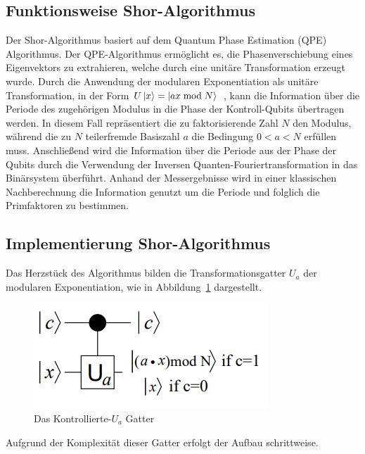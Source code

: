 \documentclass[lettersize,journal]{IEEEtran}
\begin{document}
\subsection{Funktionsweise Shor-Algorithmus}

Der Shor-Algorithmus basiert auf dem Quantum Phase Estimation (QPE) Algorithmus.
Der QPE-Algorithmus ermöglicht es, die Phasenverschiebung eines Eigenvektors zu extrahieren,
welche durch eine unitäre Transformation erzeugt wurde.
Durch die Anwendung der modularen Exponentiation als unitäre Transformation,
in der Form \(U\ket{x} = \ket{ax \bmod N}\)~\cite{IBM:Shor},
kann die Information über die Periode des zugehörigen Modulus in die Phase der Kontroll-Qubits übertragen werden.
In diesem Fall repräsentiert die zu faktorisierende Zahl \(N\) den Modulus,
während die zu \(N\) teilerfremde Basiszahl \(a\) die Bedingung \(0 < a < N\) erfüllen muss.
Anschließend wird die Information über die Periode aus der Phase der Qubits
durch die Verwendung der Inversen Quanten-Fouriertransformation in das Binärsystem überführt.
Anhand der Messergebnisse wird in einer klassischen Nachberechnung die Information genutzt
um die Periode und folglich die Primfaktoren zu bestimmen.

\subsection{Implementierung Shor-Algorithmus}
Das Herzstück des Algorithmus bilden die Transformationsgatter \(U_a\) der modularen Exponentiation,
wie in Abbildung~\ref{fig:c-Ugate} dargestellt.
\begin{figure}[h]
\caption{Das Kontrollierte-\(U_a\) Gatter~\cite{beauregard2003circuit}}
\label{fig:c-Ugate}
\includegraphics[width=\linewidth]{c-Ugate.PNG}
\centering
\end{figure}
Aufgrund der Komplexität dieser Gatter erfolgt der Aufbau schrittweise.
\end{document}
